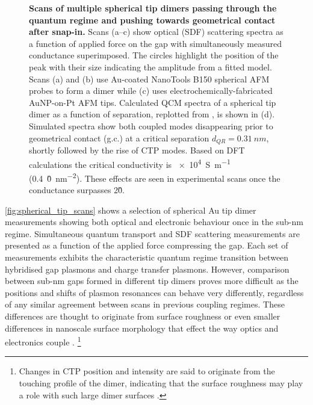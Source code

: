 \documentclass[a4paper, 11pt]{article}
\begin{document}
\begin{figure}[p]
\caption[Scans of multiple spherical tip dimers passing through the quantum regime and pushing towards geometrical contact after snap-in]{\textbf{Scans of multiple spherical tip dimers passing through the quantum regime and pushing towards geometrical contact after snap-in.} Scans (a--c) show optical (SDF) scattering spectra as a function of applied force on the gap with simultaneously measured conductance superimposed. The circles highlight the position of the peak with their size indicating the amplitude from a fitted model. Scans (a) and (b) use Au-coated NanoTools B150 spherical AFM probes to form a dimer while (c) uses electrochemically-fabricated AuNP-on-Pt AFM tips. Calculated QCM spectra of a spherical tip dimer as a function of separation, replotted from \cite{savage2012}, is shown in (d). Simulated spectra show both coupled modes disappearing prior to geometrical contact (g.c.) at a critical separation $d_{QR}=\SI{0.31}{nm}$, shortly followed by the rise of CTP modes. Based on DFT calculations the critical conductivity is \SI{e4}{S.m^{-1}} (\SI{0.4}{\G0.nm^{-2}}). These effects are seen in experimental scans once the conductance surpasses 2\G0.}
\label{fig:spherical_tip_scans}
\end{figure}

\autoref{fig:spherical_tip_scans} shows a selection of spherical Au tip dimer measurements showing both optical and electronic behaviour once in the sub-nm regime. Simultaneous quantum transport and SDF scattering measurements are presented as a function of the applied force compressing the gap. Each set of measurements exhibits the characteristic quantum regime transition between hybridised gap plasmons and charge transfer plasmons. However, comparison between sub-nm gaps formed in different tip dimers proves more difficult as the positions and shifts of plasmon resonances can behave very differently, regardless of any similar agreement between scans in previous coupling regimes. These differences are thought to originate from surface roughness or even smaller differences in nanoscale surface morphology that effect the way optics and electronics couple \cite{zuloaga2009, barbry2015}.%
\footnote{Changes in CTP position and intensity are said to originate from the touching profile of the dimer, indicating that the surface roughness may play a role with such large dimer surfaces \cite{zuloaga2009, barbry2015}.}
\end{document}
